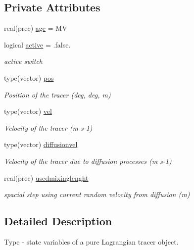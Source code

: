 \subsection*{Private Attributes}
\begin{DoxyCompactItemize}
\item 
real(prec) \mbox{\hyperlink{structtracerbase__mod_1_1tracer__state__class_aabf14569a79276d6cdd0f0a537cfb046}{age}} = MV
\item 
logical \mbox{\hyperlink{structtracerbase__mod_1_1tracer__state__class_a40841af58b7434716bc8d87bf1b3b694}{active}} = .false.
\begin{DoxyCompactList}\small\item\em active switch \end{DoxyCompactList}\item 
type(vector) \mbox{\hyperlink{structtracerbase__mod_1_1tracer__state__class_a184b3ecbe519a6cc7468fa3060131ce0}{pos}}
\begin{DoxyCompactList}\small\item\em Position of the tracer (deg, deg, m) \end{DoxyCompactList}\item 
type(vector) \mbox{\hyperlink{structtracerbase__mod_1_1tracer__state__class_ae94928588f703077bae9de12c8e9d14b}{vel}}
\begin{DoxyCompactList}\small\item\em Velocity of the tracer (m s-\/1) \end{DoxyCompactList}\item 
type(vector) \mbox{\hyperlink{structtracerbase__mod_1_1tracer__state__class_a4b2ac1e1c805253de08569d9edcc06ab}{diffusionvel}}
\begin{DoxyCompactList}\small\item\em Velocity of the tracer due to diffusion processes (m s-\/1) \end{DoxyCompactList}\item 
real(prec) \mbox{\hyperlink{structtracerbase__mod_1_1tracer__state__class_ad7003d7cad16a57c0e67ca4faf66bb11}{usedmixinglenght}}
\begin{DoxyCompactList}\small\item\em spacial step using current random velocity from diffusion (m) \end{DoxyCompactList}\end{DoxyCompactItemize}


\subsection{Detailed Description}
Type -\/ state variables of a pure Lagrangian tracer object. 

